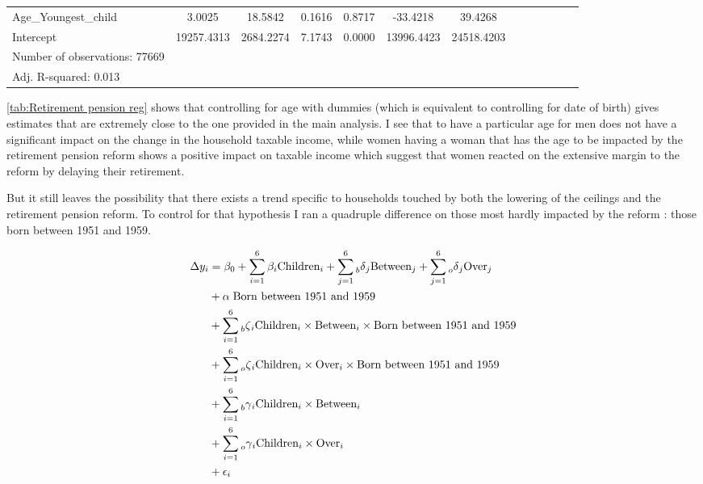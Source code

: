 \begin{subappendices}
\begin{table}[H]
{\begin{tabular}{lcccccccccccc}
$$Age_Youngest_child                        &     3.0025 &    18.5842 &   0.1616 &      0.8717 &    -33.4218 &    39.4268  \\
Intercept                                 & 19257.4313 &  2684.2274 &   7.1743 &      0.0000 &  13996.4423 & 24518.4203  \\
\hline
\hline
Number of observations: 77669 \\
Adj. R-squared:      0.013 \\
\bottomrule
\end{tabular}
}
\end{table} 
\autoref{tab:Retirement pension reg} shows that controlling for age with dummies (which is equivalent to controlling for date of birth) gives estimates that are extremely close to the one provided in the main analysis. I see that to have a particular age for men does not have a significant impact on the change in the household taxable income, while women having a woman that has the age to be impacted by the retirement pension reform shows a positive impact on taxable income which suggest that women reacted on the extensive margin to the reform by delaying their retirement. 




But it still leaves the possibility that there exists a trend specific to households touched by both the lowering of the ceilings and the retirement pension reform. To control for that hypothesis I ran a quadruple difference on those most hardly impacted by the reform : those born between 1951 and 1959.


  \begin{align}
    \label{eq:quadruple-diff}
  \begin{split} 
  \Delta y_i &= \beta_0 + \sum_{i=1}^{6} {\beta_i \text{Children}_i} + \sum_{j=1}^{6} {\prescript{}{b}\delta_j \text{Between}_j}  
                + \sum_{j=1}^{6} {\prescript{}{o}\delta_j \text{Over}_j} \\
      & +  \alpha \; \text{Born between 1951 and 1959} \\
      &+ \sum_{i=1}^6 {\prescript{}{b}\zeta_{i} \text{Children}_i \times \text{Between}_i} \times \text{Born between 1951 and 1959}  \\
      &+ \sum_{i=1}^6 {\prescript{}{o}\zeta_{i} \text{Children}_i \times \text{Over}_i} \times \text{Born between 1951 and 1959} \\
      &+ \sum_{i=1}^6 {\prescript{}{b}\gamma_{i} \text{Children}_i \times \text{Between}_i} \\
      &+ \sum_{i=1}^6 {\prescript{}{o}\gamma_{i} \text{Children}_i \times \text{Over}_i} \\
      & + \epsilon_i
  \end{split}
  \end{align}


\end{subappendices}
